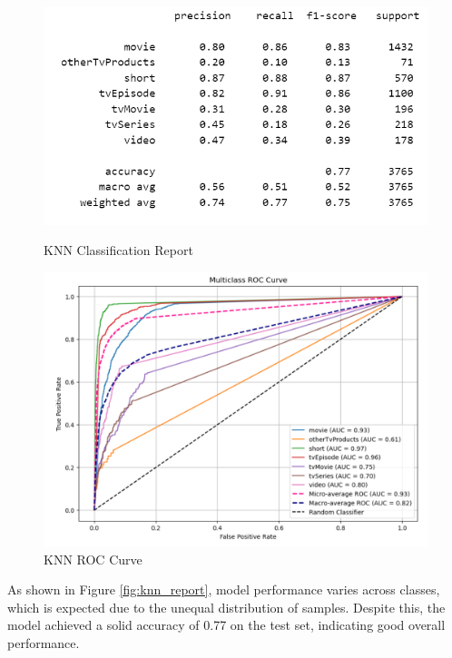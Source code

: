 \documentclass[10pt]{article}
\begin{document}
\begin{figure}[ht]
    \centering
    \begin{minipage}{0.48\textwidth}
        \centering
        \includegraphics[width=\linewidth]{Report_knn.png}
        \caption{KNN Classification Report}
        \label{fig:knn_report}
    \end{minipage}
    \hfill
    \begin{minipage}{0.48\textwidth}
        \centering
        \includegraphics[width=\linewidth]{rocknn.png}
        \caption{KNN ROC Curve}
        \label{fig:knn_roc}
    \end{minipage}
\end{figure}
As shown in Figure \ref{fig:knn_report}, model performance varies across classes, which is expected due to the unequal distribution of samples. Despite this, the model achieved a solid accuracy of 0.77 on the test set, indicating good overall performance. \newline
\end{document}

